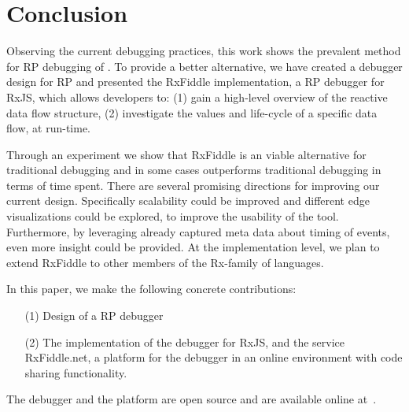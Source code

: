 \section{Conclusion}
Observing the current debugging practices, this work shows the prevalent method for RP debugging of \printfdebugging{}.
To provide a better alternative, we have created a debugger design for RP and presented the RxFiddle implementation, a RP debugger for RxJS, which allows developers to: (1) gain a high-level overview of the reactive data flow structure, (2) investigate the values and life-cycle of a specific data flow, at run-time.

Through an experiment we show that RxFiddle is an viable alternative for traditional debugging and in some cases outperforms traditional debugging in terms of time spent. There are several promising directions for improving our current design.
Specifically scalability could be improved and different edge visualizations could be explored, to improve the usability of the tool. Furthermore, by leveraging already captured meta data about timing of events, even more insight could be provided. At the implementation level, we plan to extend RxFiddle to other members of the Rx-family of languages.

In this paper, we make the following concrete contributions:
\begin{itemize}
\item[(1)] Design of a RP debugger
\item[(2)] The implementation of the debugger for RxJS, and the service RxFiddle.net, a platform for the debugger in an online environment with code sharing functionality.
\end{itemize}

The debugger and the platform are open source and are available online at~\cite{rxfiddle-doi}.
